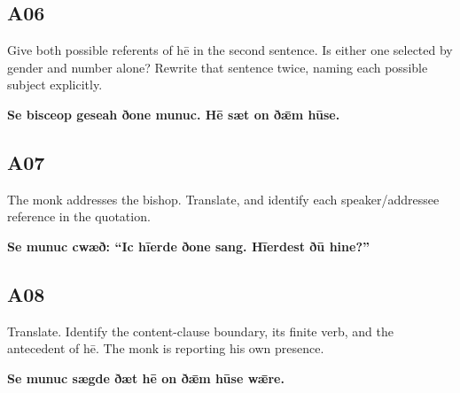 \par\begin{minipage}{\linewidth}\raggedright
\subsection*{A06}

Give both possible referents of hē in the second sentence. Is either one selected by gender and number alone? Rewrite that sentence twice, naming each possible subject explicitly.

\textbf{Se bisceop geseah ðone munuc. Hē sæt on ðǣm hūse.}

\end{minipage}\par\addvspace{4pt}

\par\begin{minipage}{\linewidth}\raggedright
\subsection*{A07}

The monk addresses the bishop. Translate, and identify each speaker/\allowbreak{}addressee reference in the quotation.

\textbf{Se munuc cwæð: “Ic hīerde ðone sang. Hīerdest ðū hine?”}

\end{minipage}\par\addvspace{4pt}

\par\begin{minipage}{\linewidth}\raggedright
\subsection*{A08}

Translate. Identify the content-clause boundary, its finite verb, and the antecedent of hē. The monk is reporting his own presence.

\textbf{Se munuc sægde ðæt hē on ðǣm hūse wǣre.}

\end{minipage}\par\addvspace{4pt}

